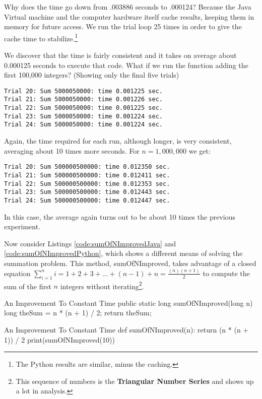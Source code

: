Why does the time go down from .003886 seconds to .000124? Because the Java Virtual machine and the computer hardware itself cache results, keeping them in memory for future access. We run the trial loop 25 times in order to give the cache time to stabilize.\footnote{The Python results are similar, minus the caching.}

We discover that the time is fairly consistent and it takes on average about 0.000125 seconds to execute that code. What if we run the function adding the first 100,000 integers? (Showing only the final five trials)

\begin{verbatim}
Trial 20: Sum 5000050000: time 0.001225 sec.
Trial 21: Sum 5000050000: time 0.001226 sec.
Trial 22: Sum 5000050000: time 0.001225 sec.
Trial 23: Sum 5000050000: time 0.001224 sec.
Trial 24: Sum 5000050000: time 0.001224 sec.
\end{verbatim}


Again, the time required for each run, although longer, is very consistent, averaging about 10 times more seconds. For $n = 1,000,000$  we get:

\begin{verbatim}
Trial 20: Sum 500000500000: time 0.012350 sec.
Trial 21: Sum 500000500000: time 0.012411 sec.
Trial 22: Sum 500000500000: time 0.012353 sec.
Trial 23: Sum 500000500000: time 0.012443 sec.
Trial 24: Sum 500000500000: time 0.012447 sec.
\end{verbatim}

In this case, the average again turns out to be about 10 times the previous experiment.

Now consider Listings \ref{code:sumOfNImprovedJava} and \ref{code:sumOfNImprovedPython}, which shows a different means of solving the summation problem. This method, sumOfNImproved, takes advantage of a closed equation $\sum_{i=1}^{n} i = 1+2+3+\dots+(n-1)+n =  \frac {(n)(n+1)}{2}$ to compute the sum of the first $n$ integers without iterating\footnote{This sequence of numbers is the \textbf{Triangular Number Series} and shows up a lot in analysis.}.

\begin{javacode}[label={code:sumOfNImprovedJava}]{An Improvement To Constant Time}
public static long sumOfNImproved(long n) { 
	long theSum = n * (n + 1) / 2;
	return theSum;
}
\end{javacode}


\begin{pycode}[label={code:sumOfNImprovedPython}]{An Improvement To Constant Time}
def sumOfNImproved(n):
	return (n * (n + 1)) / 2
print(sumOfNImproved(10))
\end{pycode}

